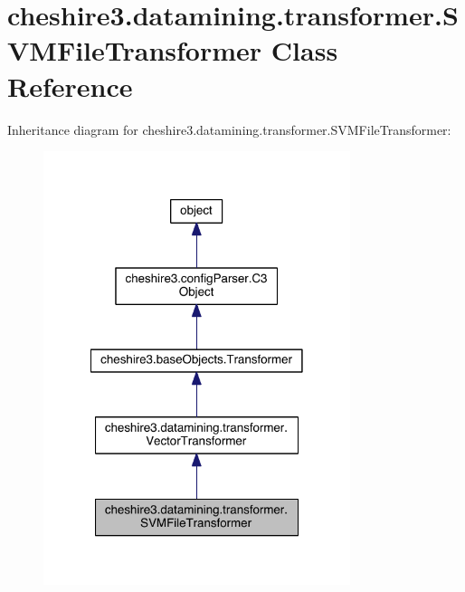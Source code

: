 \hypertarget{classcheshire3_1_1datamining_1_1transformer_1_1_s_v_m_file_transformer}{\section{cheshire3.\-datamining.\-transformer.\-S\-V\-M\-File\-Transformer Class Reference}
\label{classcheshire3_1_1datamining_1_1transformer_1_1_s_v_m_file_transformer}
}


Inheritance diagram for cheshire3.\-datamining.\-transformer.\-S\-V\-M\-File\-Transformer\-:
\nopagebreak
\begin{figure}[H]
\begin{center}
\leavevmode
\includegraphics[width=254pt]{classcheshire3_1_1datamining_1_1transformer_1_1_s_v_m_file_transformer__inherit__graph}
\end{center}
\end{figure}


